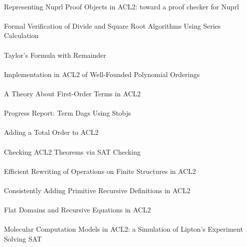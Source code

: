 \documentclass{article}
\begin{document}
\cite{02-caldwell-nuprl} \\
Representing Nuprl Proof Objects in ACL2: toward a proof checker for Nuprl \\

\cite{02-sawada-sqrt} \\
Formal Verification of Divide and Square Root Algorithms Using Series Calculation \\

\cite{02-gamboa-taylor} \\
Taylor's Formula with Remainder \\

\cite{02-bulo-polynomial} \\
Implementation in ACL2 of Well-Founded Polynomial Orderings \\

\cite{02-reina-terms} \\
A Theory About First-Order Terms in ACL2 \\

\cite{02-reina-dags} \\
Progress Report: Term Dags Using Stobjs \\

\cite{02-manolios-adding} \\
Adding a Total Order to ACL2 \\

\cite{02-sumners-sat} \\
Checking ACL2 Theorems via SAT Checking \\

\cite{02-kaufmann-rewriting} \\
Efficient Rewriting of Operations on Finite Structures in ACL2 \\

\cite{02-cowles-primitive} \\
Consistently Adding Primitive Recursive Definitions in ACL2 \\

\cite{02-cowles-flat} \\
Flat Domains and Recursive Equations in ACL2 \\

\cite{02-martin-molecular} \\
Molecular Computation Models in ACL2: a Simulation of Lipton's Experiment Solving SAT \\
\end{document}
